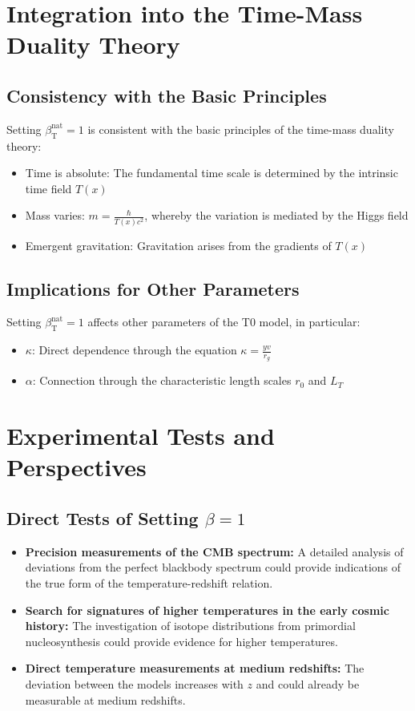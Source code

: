 \documentclass[12pt,a4paper]{article}
\newcommand{\Tfield}{T(x)}
\newcommand{\betaT}{\beta_{\text{T}}}
\begin{document}
	\section{Integration into the Time-Mass Duality Theory}
	
	\subsection{Consistency with the Basic Principles}
	
	Setting \(\betaT^{\text{nat}} = 1\) is consistent with the basic principles of the time-mass duality theory:
	\begin{itemize}
		\item Time is absolute: The fundamental time scale is determined by the intrinsic time field \(\Tfield\)
		\item Mass varies: \(m = \frac{\hbar}{\Tfield c^2}\), whereby the variation is mediated by the Higgs field
		\item Emergent gravitation: Gravitation arises from the gradients of \(\Tfield\)
	\end{itemize}
	
	\subsection{Implications for Other Parameters}
	
	Setting \(\betaT^{\text{nat}} = 1\) affects other parameters of the T0 model, in particular:
	\begin{itemize}
		\item \(\kappa\): Direct dependence through the equation \(\kappa = \frac{y v}{r_g}\)
		\item \(\alpha\): Connection through the characteristic length scales \(r_0\) and \(L_T\)
	\end{itemize}
	
	\section{Experimental Tests and Perspectives}
	
	\subsection{Direct Tests of Setting \(\beta = 1\)}
	
	\begin{itemize}
		\item \textbf{Precision measurements of the CMB spectrum:} A detailed analysis of deviations from the perfect blackbody spectrum could provide indications of the true form of the temperature-redshift relation.
		\item \textbf{Search for signatures of higher temperatures in the early cosmic history:} The investigation of isotope distributions from primordial nucleosynthesis could provide evidence for higher temperatures.
		\item \textbf{Direct temperature measurements at medium redshifts:} The deviation between the models increases with \(z\) and could already be measurable at medium redshifts.
	\end{itemize}
	
\end{document}
